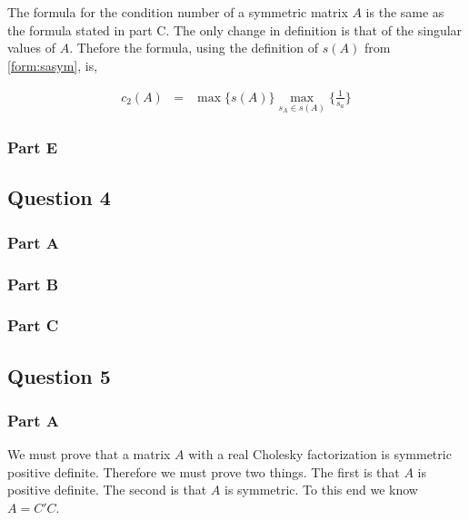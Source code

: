 The formula for the condition number of a symmetric matrix \(A\) is the same as the formula stated in part C.
The only change in definition is that of the singular values of \(A\).
Thefore the formula, using the definition of \(s(A)\) from \ref{form:sasym}, is,

\begin{eqnarray}
  c_2(A) &=& \max \{s(A)\} \max_{s_A \in s(A)} \{\frac{1}{s_a}\}
\end{eqnarray}

\newpage
\subsubsection{Part E}





\newpage
\subsection{Question 4}

\subsubsection{Part A}



\subsubsection{Part B}



\subsubsection{Part C}

\newpage
\subsection{Question 5}
\subsubsection{Part A}

We must prove that a matrix \(A\) with a real Cholesky factorization is symmetric positive definite.
Therefore we must prove two things.
The first is that \(A\) is positive definite.
The second is that \(A\) is symmetric.
To this end we know \(A = C'C\).

